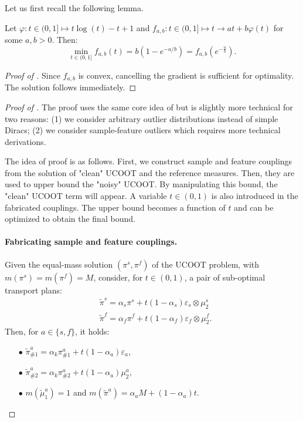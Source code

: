 Let us first recall the following lemma.
\begin{lemma}
\label{slem:bound}
Let $\varphi: t \in (0, 1] \mapsto t\log(t) - t + 1$ and
$f_{a, b}: t \in (0, 1] \mapsto t \to at + b \varphi(t)$ for some $a, b > 0$.
Then:
\begin{equation}
    \min_{t \in (0, 1]} f_{a, b}(t) = b(1 - e^{-a/b}) = f_{a, b}(e^{-\frac{a}{b}}).
\end{equation}
\end{lemma}
\begin{proof}[Proof of ]
  Since $f_{a,b}$ is convex, cancelling the gradient is sufficient for optimality.
  The solution follows immediately.
\end{proof}

\begin{proof}[Proof of ]
  The proof uses the same core idea of \citep{Fatras21} but is slightly more technical
  for two reasons: (1) we consider arbitrary outlier distributions instead of simple Diracs;
  (2) we consider sample-feature outliers which requires more technical derivations.

  The idea of proof is as follows. First, we construct sample and feature couplings
  from the solution of "clean" UCOOT and the reference measures. Then, they are used to
  upper bound the "noisy" UCOOT. By manipulating this bound, the "clean" UCOOT term will appear.
  A variable $t \in (0,1)$ is also introduced in the fabricated couplings.
  The upper bound becomes a function of $t$ and can be optimized to obtain the final bound.

  \paragraph{Fabricating sample and feature couplings.}
  Given the equal-mass solution $(\pi^s, \pi^f)$ of the UCOOT problem,
  with $m(\pi^s) = m(\pi^f) = M$, consider, for $t \in (0,1)$, a pair of
  sub-optimal transport plans:
  \begin{align}
    &\widetilde{\pi}^s = \alpha_s \pi^s + t (1-\alpha_s) \varepsilon_s \otimes \mu^s_2\\
    &\widetilde{\pi}^f = \alpha_f \pi^f + t (1-\alpha_f) \varepsilon_f \otimes \mu^f_2.
  \end{align}
  Then, for $a\in \{s, f\}$, it holds:
  \begin{itemize}
    \item[$\bullet$] $\widetilde{\pi}^a_{\#1} = \alpha_k \pi^a_{\#1} + t (1 - \alpha_a) \varepsilon_a$,
    \item[$\bullet$] $\widetilde{\pi}^a_{\#2} = \alpha_k \pi^a_{\#2} + t (1 - \alpha_a) \mu^a_2$,
    \item[$\bullet$] $m(\widetilde{\mu}^a_1) = 1$ and $m(\widetilde{\pi}^a) = \alpha_a M + (1-\alpha_a) t$.
  \end{itemize}


\end{proof}
